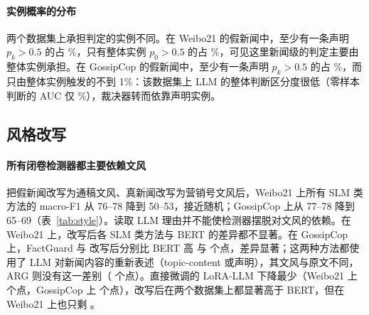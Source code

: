 \paragraph{实例概率的分布}
两个数据集上承担判定的实例不同。在 Weibo21 的假新闻中，至少有一条声明 $p_k>0.5$ 的占 \%，只有整体实例 $p_0>0.5$ 的占 \%，可见这里新闻级的判定主要由整体实例承担。在 GossipCop 的假新闻中，至少有一条声明 $p_k>0.5$ 的占 \%，而只由整体实例触发的不到 1\%：该数据集上 LLM 的整体判断区分度很低（零样本判断的 AUC 仅 \%），裁决器转而依靠声明实例。

\subsection{风格改写}\label{sec:exp-style}

\begin{table}[!htbp]
\centering\small
\caption{风格改写前后的 macro-F1（\%）。只统计成功改写的样本，“原文”为同一批样本改写前的结果。分隔线以下两行是只读取 LLM 输出文本、不读新闻原文的 BERT。}\label{tab:style}
\end{table}

\paragraph{所有闭卷检测器都主要依赖文风}
把假新闻改写为通稿文风、真新闻改写为营销号文风后，Weibo21 上所有 SLM 类方法的 macro-F1 从 76--78 降到 50--53，接近随机；GossipCop 上从 77--78 降到 65--69（表~\ref{tab:style}）。读取 LLM 理由并不能使检测器摆脱对文风的依赖。在 Weibo21 上，改写后各 SLM 类方法与 BERT 的差异都不显著。在 GossipCop 上，FactGuard 与 \method{} 改写后分别比 BERT 高  与  个点，差异显著；这两种方法都使用了 LLM 对新闻内容的重新表述（topic-content 或声明），其文风与原文不同，ARG 则没有这一差别（ 个点）。直接微调的 LoRA-LLM 下降最少（Weibo21 上  个点，GossipCop 上  个点），改写后在两个数据集上都显著高于 BERT，但在 Weibo21 上也只剩 。

